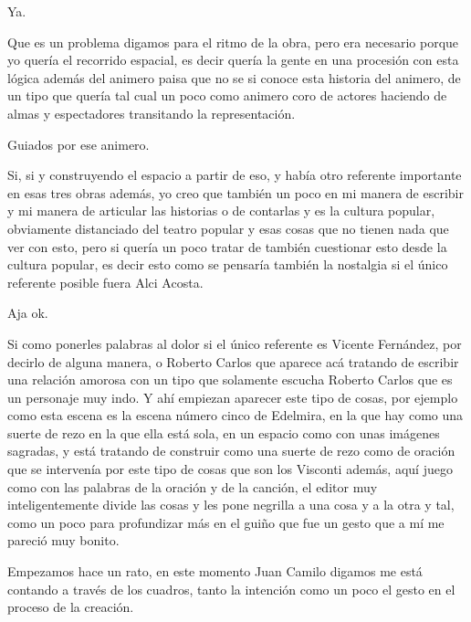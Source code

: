 Ya.

Que es un problema digamos para el ritmo de la obra, pero era necesario porque yo quería el recorrido espacial, es decir quería la gente en una procesión con esta lógica además del animero paisa que no se si conoce esta historia del animero, de un tipo que quería tal cual un poco como animero coro de actores haciendo de almas y espectadores transitando la representación.

Guiados por ese animero.

Si, si y construyendo el espacio a partir de eso, y había otro referente importante en esas tres obras además, yo creo que también un poco en mi manera de escribir y mi manera de articular las historias o de contarlas y es la cultura popular, obviamente distanciado del teatro popular y esas cosas que no tienen nada que ver con esto, pero si quería un poco tratar de también cuestionar esto desde la cultura popular, es decir esto como se pensaría también la nostalgia si el único referente posible fuera Alci Acosta.

Aja ok.

Si como ponerles palabras al dolor si el único referente es Vicente Fernández, por decirlo de alguna manera, o Roberto Carlos que aparece acá tratando de escribir una relación amorosa con un tipo que solamente escucha Roberto Carlos que es un personaje muy indo.
Y ahí empiezan aparecer este tipo de cosas, por ejemplo como esta escena es la escena número cinco de Edelmira, en la que hay como una suerte de rezo en la que ella está sola, en un espacio como con unas imágenes sagradas, y está tratando de construir como una suerte de rezo como de oración que se intervenía por este tipo de cosas que son los Visconti además, aquí juego como con las palabras de la oración y de la canción, el editor muy inteligentemente divide las cosas y  les pone negrilla a una cosa y a la otra y tal, como un poco para profundizar más en el guiño que fue un gesto que a mí me pareció muy bonito.

Empezamos hace un rato, en este momento Juan Camilo digamos me está contando a través de los cuadros, tanto la intención como un poco el gesto en el proceso de la creación.

